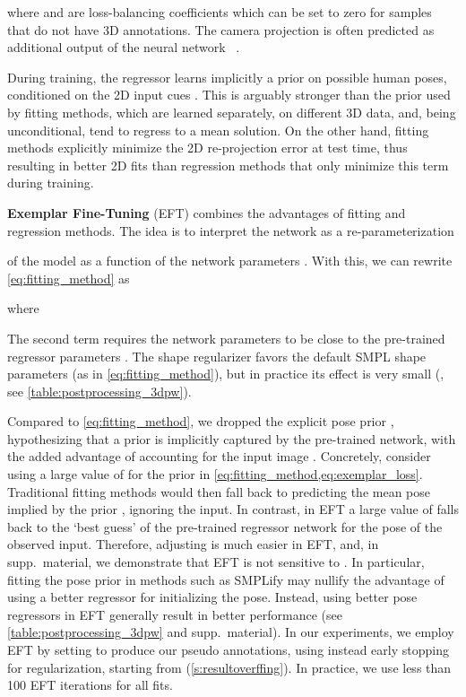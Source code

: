 \documentclass[10pt,twocolumn,letterpaper]{article}
\begin{document}
where  and  are loss-balancing coefficients which can be set to zero for samples that do not have 3D annotations.
	The camera projection  is often predicted as additional output of the neural network ~\cite{kanazawa2018end,humanMotionKanazawa19, xu2019denserac,kolotouros2019spin}.
	
	During training, the regressor  learns implicitly a prior on possible human poses, conditioned on the 2D input cues .
	This is arguably stronger than the prior  used by fitting methods, which are learned separately, on different 3D data, and, being unconditional, tend to regress to a mean solution.
	On the other hand, fitting methods explicitly minimize the 2D re-projection error  at test time, thus resulting in better 2D fits than regression methods that only minimize this term during training.
	
	\textbf{Exemplar Fine-Tuning} (EFT) combines the advantages of fitting and regression methods.
	The idea is to interpret the network  as a re-parameterization 
	
	of the model as a function of the network parameters .
	With this, we can rewrite \cref{eq:fitting_method} as
	
	where
	
The second term requires the network parameters  to be close to the pre-trained regressor parameters .
	The shape regularizer 
	favors the default SMPL shape parameters (as in \cref{eq:fitting_method}), but in practice its effect is very small (, see \cref{table:postprocessing_3dpw}).
	
	Compared to \cref{eq:fitting_method}, we dropped the explicit pose prior , hypothesizing that a prior is implicitly captured by the pre-trained network, with the added advantage of accounting for the input image .
	Concretely, consider using a large value of  for the prior in \cref{eq:fitting_method,eq:exemplar_loss}.
	Traditional fitting methods would then fall back to predicting the mean pose implied by the prior , ignoring the input.
	In contrast, in EFT a large value of  falls back to the `best guess' of the pre-trained regressor network for the pose of the observed input.
Therefore, adjusting  is much easier in EFT\@, and, in supp.~material, we demonstrate that EFT is not sensitive to .
	In particular, fitting the pose prior in methods such as SMPLify may nullify the advantage of using a better regressor for initializing the pose.
Instead, using better pose regressors in EFT generally result in better performance (see \cref{table:postprocessing_3dpw} and supp.~material).
In our experiments, we employ EFT by setting  to produce our pseudo annotations, using instead early stopping for regularization, starting from  (\cref{s:resultoverffing}).
In practice, we use less than 100 EFT iterations for all fits.
\end{document}
